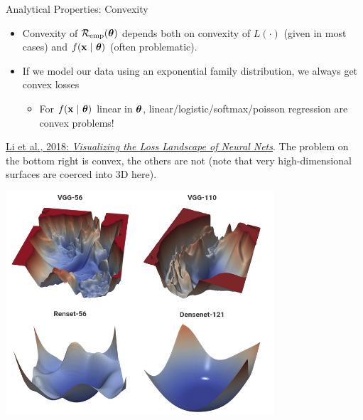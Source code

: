 \documentclass[11pt,compress,t,notes=noshow, xcolor=table]{beamer}
\begin{document}

\begin{vbframe}{Analytical Properties: Convexity}

\begin{itemize}
  \setlength\itemsep{1em}
  \item Convexity of $\mathcal{R}_{\text{emp}}(\bm{\theta})$ depends both on convexity of $L(\cdot)$ (given in most cases) and $f(\mathbf{x} ~|~ \bm{\theta})$ (often problematic).
  \item If we model our data using an exponential family distribution, we always get convex losses
  \begin{itemize} 
    \item For $f(\mathbf{x} ~|~ \bm{\theta})$ linear in $\bm{\theta}$, linear/logistic/softmax/poisson regression are convex problems! 
  \end{itemize}  
\end{itemize} 

\vfill

\begin{minipage}[b]{0.5\textwidth}
  \footnotesize \raggedright
  \href{https://arxiv.org/pdf/1712.09913.pdf}{Li et al., 2018: 
  \textit{Visualizing the Loss Landscape of Neural Nets}}. 
  The problem on the bottom right is convex, the others are not (note that 
  very high-dimensional surfaces are coerced into 3D here).  
  \\
  \phantom{foo}
\end{minipage}%
\begin{minipage}[b]{0.05\textwidth}
  \phantom{foo}
\end{minipage}%
\begin{minipage}[b]{0.45\textwidth}
  \includegraphics[width=0.75\textwidth]{
  figure_man/convex-vs-nonconfex-landscape}
\end{minipage}%

\end{vbframe}
\end{document}
